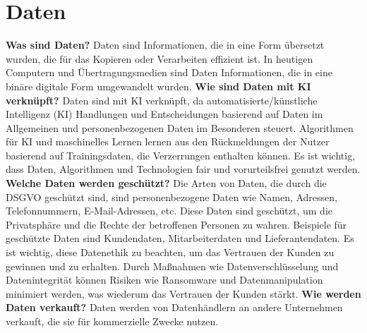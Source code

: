\section{Daten}
\label{sec:data}
\textbf{Was sind Daten?}\newline
Daten sind Informationen, die in eine Form übersetzt wurden, die für das Kopieren oder Verarbeiten effizient ist. In heutigen Computern und Übertragungsmedien sind Daten Informationen, die in eine binäre digitale Form umgewandelt wurden.\newline
\textbf{Wie sind Daten mit KI verknüpft?}\newline
Daten sind mit KI verknüpft, da automatisierte/künstliche Intelligenz (KI) Handlungen und Entscheidungen basierend auf Daten im Allgemeinen und personenbezogenen Daten im Besonderen steuert. Algorithmen für KI und maschinelles Lernen lernen aus den Rückmeldungen der Nutzer basierend auf Trainingsdaten, die Verzerrungen enthalten können. Es ist wichtig, dass Daten, Algorithmen und Technologien fair und vorurteilsfrei genutzt werden.\newline
\textbf{Welche Daten werden geschützt?}\newline
Die Arten von Daten, die durch die DSGVO geschützt sind, sind personenbezogene Daten wie Namen, Adressen, Telefonnummern, E-Mail-Adressen, etc. Diese Daten sind geschützt, um die Privatsphäre und die Rechte der betroffenen Personen zu wahren. Beispiele für geschützte Daten sind Kundendaten, Mitarbeiterdaten und Lieferantendaten. Es ist wichtig, diese Datenethik zu beachten, um das Vertrauen der Kunden zu gewinnen und zu erhalten. Durch Maßnahmen wie Datenverschlüsselung und Datenintegrität können Risiken wie Ransomware und Datenmanipulation minimiert werden, was wiederum das Vertrauen der Kunden stärkt.\newline
\textbf{Wie werden Daten verkauft?}\newline
Daten werden von Datenhändlern an andere Unternehmen verkauft, die sie für kommerzielle Zwecke nutzen.
